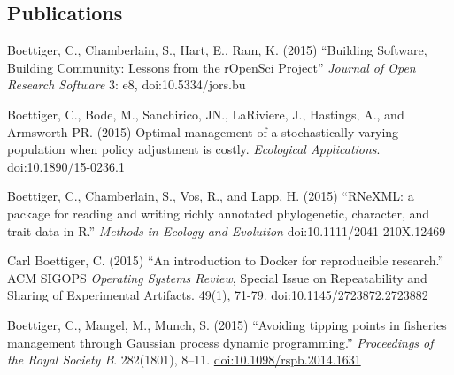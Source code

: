 \documentclass[margin]{res}
\begin{document}
\begin{resume}
\section{Publications}

\begin{etaremune}[start = 16]
\item Boettiger, C., Chamberlain, S., Hart, E., Ram, K. (2015) 
  ``Building Software, Building Community: Lessons from the rOpenSci Project''
  \emph{Journal of Open Research Software} 3: e8, doi:10.5334/jors.bu

\item  Boettiger, C., Bode, M., Sanchirico, JN., LaRiviere, J., Hastings, A., and Armsworth PR. (2015) 
  Optimal management of a stochastically varying population when policy adjustment is
  costly. \emph{Ecological Applications}. doi:10.1890/15-0236.1

\item Boettiger, C., Chamberlain, S., Vos, R., and Lapp, H. (2015) 
  ``RNeXML: a package for reading and writing richly annotated
  phylogenetic, character, and trait data in R.'' 
  \emph{Methods in Ecology and Evolution} 
  doi:10.1111/2041-210X.12469

\item Carl Boettiger, C. (2015) ``An introduction to Docker for reproducible
  research.'' ACM SIGOPS \emph{Operating Systems Review}, Special Issue on Repeatability
  and Sharing of Experimental Artifacts. 49(1), 71-79. 
  doi:10.1145/2723872.2723882

\item Boettiger, C., Mangel, M., Munch, S. (2015) 
      ``Avoiding tipping points in fisheries management through
	    Gaussian process dynamic programming.'' 
      \emph{Proceedings of the Royal Society B}. 282(1801), 8–11.
      \href{http://doi.org/10.1098/rspb.2014.1631}{doi:10.1098/rspb.2014.1631}


\end{etaremune}
\end{resume}
\end{document}
